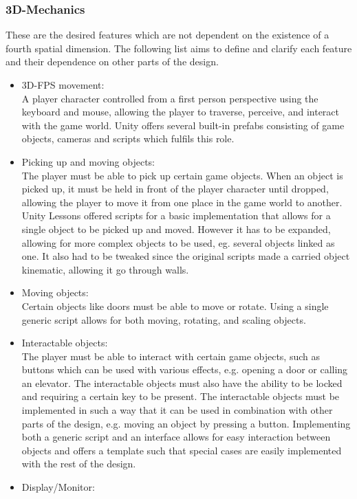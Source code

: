 \subsubsection{3D-Mechanics}
These are the desired features which are not dependent on the existence of a fourth spatial dimension. The following list aims to define and clarify each feature and their dependence on other parts of the design.
\begin{itemize}
	\item 3D-FPS movement:\\
	A player character controlled from a first person perspective using the keyboard and mouse, allowing the player to traverse, perceive, and interact with the game world. Unity offers several built-in prefabs consisting of game objects, cameras and scripts which fulfils this role.
	\item Picking up and moving objects:\\
	The player must be able to pick up certain game objects. When an object is picked up, it must be held in front of the player character until dropped, allowing the player to move it from one place in the game world to another. Unity Lessons\cite{unityLessons} offered scripts for a basic implementation that allows for a single object to be picked up and moved. However it has to be expanded, allowing for more complex objects to be used, eg. several objects linked as one. It also had to be tweaked since the original scripts made a carried object kinematic, allowing it go through walls.  
	\item Moving objects:\\
	Certain objects like doors must be able to move or rotate. Using a single generic script allows for both moving, rotating, and scaling objects. 
	\item Interactable objects:\\
	The player must be able to interact with certain game objects, such as buttons which can be used with various effects, e.g. opening a door or calling an elevator. The interactable objects must also have the ability to be locked and requiring a certain key to be present. The interactable objects must be implemented in such a way that it can be used in combination with other parts of the design, e.g. moving an object by pressing a button. Implementing both a generic script and an interface allows for easy interaction between objects and offers a template such that special cases are easily implemented with the rest of the design.
	\item Display/Monitor:\\

\end{itemize}

